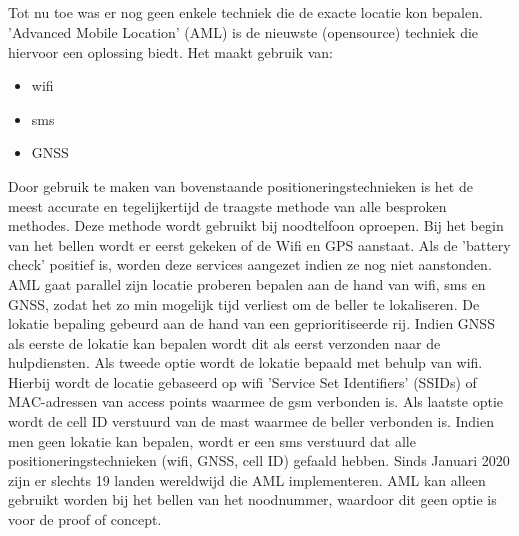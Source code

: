 \subsection{}
Tot nu toe was er nog geen enkele techniek die de exacte locatie kon bepalen. 'Advanced Mobile Location' (AML) is de nieuwste (opensource) techniek die hiervoor een oplossing biedt. Het maakt gebruik van:
\begin{itemize}
	\item wifi
	\item sms
	\item GNSS
\end{itemize}
Door gebruik te maken van bovenstaande positioneringstechnieken is het de meest accurate en tegelijkertijd de traagste methode van alle besproken methodes. 
\newline
Deze methode wordt gebruikt bij noodtelfoon oproepen. Bij het begin van het bellen wordt er eerst gekeken of de Wifi en GPS aanstaat. Als de 'battery check' positief is, worden deze services aangezet indien ze nog niet aanstonden. 
\newline
AML gaat parallel zijn locatie proberen bepalen aan de hand van wifi, sms en GNSS, zodat het zo min mogelijk tijd verliest om de beller te lokaliseren. De lokatie bepaling gebeurd aan de hand van een geprioritiseerde rij. Indien GNSS als eerste de lokatie kan bepalen wordt dit als eerst verzonden naar de hulpdiensten. 
Als tweede optie wordt de lokatie bepaald met behulp van wifi. Hierbij wordt de locatie gebaseerd op wifi 'Service Set Identifiers' (SSIDs) of MAC-adressen van access points waarmee de gsm verbonden is. Als laatste optie wordt de cell ID verstuurd van de mast waarmee de beller verbonden is. Indien men geen lokatie kan bepalen, wordt er een sms verstuurd dat alle positioneringstechnieken (wifi, GNSS, cell ID) gefaald hebben.
\newline
Sinds Januari 2020 zijn er slechts 19 landen wereldwijd die AML implementeren. AML kan alleen gebruikt worden bij het bellen van het noodnummer, waardoor dit geen optie is voor de proof of concept. \autocite{aml}
